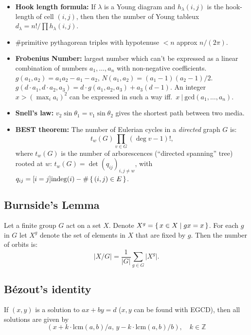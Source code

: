 \documentclass[8pt,a4paper,landscape,oneside]{amsart}
\newenvironment{myitemize}
{\begin{itemize}[leftmargin=.3cm]
	\setlength{\itemsep}{0pt}
	\setlength{\parskip}{0pt}
	\setlength{\parsep}{0pt}     }
{ \end{itemize}                  }
\begin{document}
\begin{multicols*}{3}
\begin{myitemize}
\[	\]
	\item \textbf{Hook length formula:} If $\lambda$ is a Young diagram and $h_{\lambda}(i,j)$ is the hook-length of cell $(i,j)$, then then the number of Young tableux $d_{\lambda} = n!/\prod h_{\lambda}(i,j)$.
	\item \#primitive pythagorean triples with hypotenuse $<n$ approx $n/(2\pi)$.
	\item \textbf{Frobenius Number:} largest number which can't be
		expressed as a linear combination of numbers $a_1,\ldots,a_n$
		with non-negative coefficients. $g(a_1,a_2) = a_1a_2-a_1-a_2$,
		$N(a_1,a_2)=(a_1-1)(a_2-1)/2$. $g(d\cdot a_1,d\cdot a_2,a_3) =
		d\cdot g(a_1,a_2,a_3) + a_3(d-1)$. An integer $x>\left(\max_i
		a_i\right)^2$ can be expressed in such a way iff.\ $x\ |\
		\mathrm{gcd}(a_1,\ldots,a_n)$.
	\item \textbf{Snell's law:} $v_2 \sin\theta_1 = v_1 \sin\theta_2$ gives the shortest path between two media.
	\item \textbf{BEST theorem:}
		The number of Eulerian cycles in a \emph{directed} graph $G$ is:
		\begin{equation*}
			t_w(G) \prod_{v \in G} (\deg v - 1)!,
		\end{equation*}
		where $t_w(G)$ is the number of arborescences (``directed spanning'' tree) rooted at $w$: $t_w(G) = \det\left( q_{ij} \right)_{i,j \neq w}$, with $q_{ij} = [i=j] \mathrm{indeg}(i) - \# \set{(i,j) \in E}$.
\end{myitemize}

\subsection{Burnside's Lemma}
Let a finite group $G$ act on a set $X$.
Denote $X^g = \set{ x \in X | gx = x}$.
For each $g$ in $G$ let $X^g$ denote the set of elements in $X$ that are fixed by $g$.
Then the number of orbits is:
\begin{equation*}
	\lvert X/G \rvert = \frac{1}{\lvert G \rvert} \sum_{g\in G} \lvert X^g \rvert.
\end{equation*}

\subsection{Bézout's identity}
If $(x,y)$ is a solution to $ax+by=d$ ($x, y$ can be found with EGCD),
then all solutions are given by
\[
	\left( x + k \cdot \mathrm{lcm}(a,b) / a, \, y - k \cdot \mathrm{lcm}(a,b) / b \right), \quad k \in \mathbb{Z}
\]


\end{multicols*}
\end{document}
